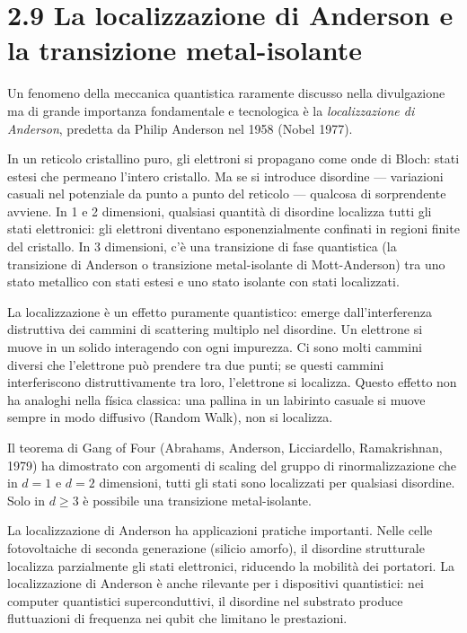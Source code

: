 \documentclass[11.5pt,a4paper,openany]{book}
\theoremstyle{remark}
\begin{document}
\section{2.9 La localizzazione di Anderson e la transizione metal-isolante}

Un fenomeno della meccanica quantistica raramente discusso nella divulgazione ma di grande importanza fondamentale e tecnologica è la \textit{localizzazione di Anderson}, predetta da Philip Anderson nel 1958 (Nobel 1977).

In un reticolo cristallino puro, gli elettroni si propagano come onde di Bloch: stati estesi che permeano l'intero cristallo. Ma se si introduce disordine --- variazioni casuali nel potenziale da punto a punto del reticolo --- qualcosa di sorprendente avviene. In 1 e 2 dimensioni, qualsiasi quantità di disordine localizza tutti gli stati elettronici: gli elettroni diventano esponenzialmente confinati in regioni finite del cristallo. In 3 dimensioni, c'è una transizione di fase quantistica (la transizione di Anderson o transizione metal-isolante di Mott-Anderson) tra uno stato metallico con stati estesi e uno stato isolante con stati localizzati.

La localizzazione è un effetto puramente quantistico: emerge dall'interferenza distruttiva dei cammini di scattering multiplo nel disordine. Un elettrone si muove in un solido interagendo con ogni impurezza. Ci sono molti cammini diversi che l'elettrone può prendere tra due punti; se questi cammini interferiscono distruttivamente tra loro, l'elettrone si localizza. Questo effetto non ha analoghi nella física classica: una pallina in un labirinto casuale si muove sempre in modo diffusivo (Random Walk), non si localizza.

Il teorema di Gang of Four (Abrahams, Anderson, Licciardello, Ramakrishnan, 1979) ha dimostrato con argomenti di scaling del gruppo di rinormalizzazione che in $d = 1$ e $d = 2$ dimensioni, tutti gli stati sono localizzati per qualsiasi disordine. Solo in $d \geq 3$ è possibile una transizione metal-isolante.

La localizzazione di Anderson ha applicazioni pratiche importanti. Nelle celle fotovoltaiche di seconda generazione (silicio amorfo), il disordine strutturale localizza parzialmente gli stati elettronici, riducendo la mobilità dei portatori. La localizzazione di Anderson è anche rilevante per i dispositivi quantistici: nei computer quantistici superconduttivi, il disordine nel substrato produce fluttuazioni di frequenza nei qubit che limitano le prestazioni.
\end{document}
